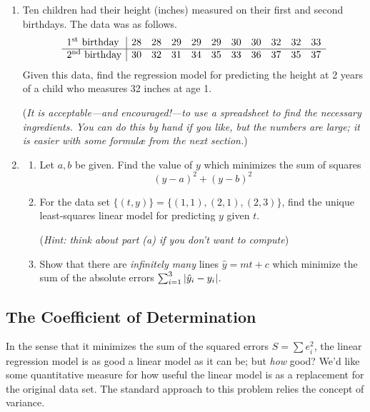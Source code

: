 \begin{exercises}{}{}
\begin{enumerate}
  
  \item Ten children had their height (inches) measured on their first and second birthdays. The data was as follows.
  \[\begin{array}{l|cccccccccc}
  \text{1\textsuperscript{st}{} birthday}&28&28&29&29&29&30&30&32&32&33\\\hline
  \text{2\textsuperscript{nd}{} birthday}&30&32&31&34&35&33&36&37&35&37
  \end{array}\]
  Given this data, find the regression model for predicting the height at 2 years of a child who measures 32 inches at age 1. %
  \par
  (\emph{It is acceptable---and encouraged!---to use a spreadsheet to find the necessary ingredients. You can do this by hand if you like, but the numbers are large; it is easier with some formulæ from the next section.})
  
  \item\begin{enumerate}
    \item Let $a,b$ be given. Find the value of $y$ which minimizes the sum of squares
    \[(y-a)^2+(y-b)^2\]
    \item For the data set $\{(t,y)\}=\{(1,1),(2,1),(2,3)\}$, find the unique least-squares linear model for predicting $y$ given $t$.\par
    (\emph{Hint: think about part (a) if you don't want to compute})
    \item	Show that there are \emph{infinitely many} lines $\hat y=mt+c$ which minimize the sum of the absolute errors $\sum_{i=1}^3\left| \hat y_i-y_i\right|$.
  \end{enumerate}
\end{enumerate}
\end{exercises}




\clearpage


\subsection{The Coefficient of Determination}

In the sense that it minimizes the sum of the squared errors $S=\sum e_i^2$, the linear regression model is as good a linear model as it can be; but \emph{how} good? We'd like some quantitative measure for how useful the linear model is as a replacement for the original data set. The standard approach to this problem relies the concept of variance.

